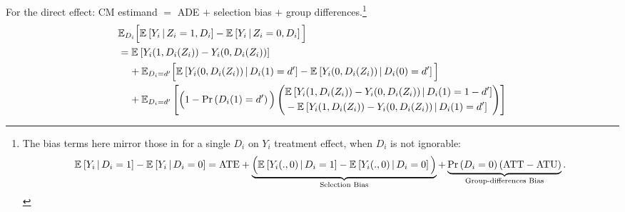 \noindent
For the direct effect: CM estimand $=$ ADE $+$ selection bias $+$ group differences.\footnote{
    The bias terms here mirror those in \cite{heckman1998characterizing,angrist2009mostly} for a single $D_i$ on $Y_i$ treatment effect, when $D_i$ is not ignorable:
    \vspace{-0.25cm}
    \[ \Egiven{ Y_i}{D_i =1} - \Egiven{ Y_i}{D_i =0}
        = \text{ATE}
        + \underbrace{\Big( \Egiven{ Y_i(.,0)}{D_i =1} - \Egiven{ Y_i(.,0)}{D_i =0} \Big)}_{
            \text{Selection Bias}}
        + \underbrace{ \Prob{D_i=0} (\text{ATT} - \text{ATU}) }_{
            \text{Group-differences Bias}}. \]
}
\begin{align*}
    & \mathbb E_{D_i} \Big[
        \Egiven{Y_i}{Z_i = 1, D_i} - \Egiven{Y_i}{Z_i = 0, D_i} \Big] \\
    & = \E{Y_i(1, D_i(Z_i)) - Y_i(0, D_i(Z_i))} \\
    & \;\;\;\; + \mathbb E_{D_i = d'} \Big[
        \Egiven{Y_i(0, D_i(Z_i))}{D_i(1) = d'} 
        - \Egiven{Y_i(0, D_i(Z_i))}{D_i(0) = d'} \Big] \\
    & \;\;\;\; + \E[D_i = d']{
        \Big(1 - \Prob{D_i(1) = d'} \Big)
        \left( \begin{aligned}
            &\Egiven{Y_i(1, D_i(Z_i)) - Y_i(0, D_i(Z_i))}{D_i(1) = 1-d'} \\ 
            &  - \Egiven{Y_i(1, D_i(Z_i)) - Y_i(0, D_i(Z_i))}{D_i(1) = d'}
            \end{aligned} \right) }
\end{align*}

